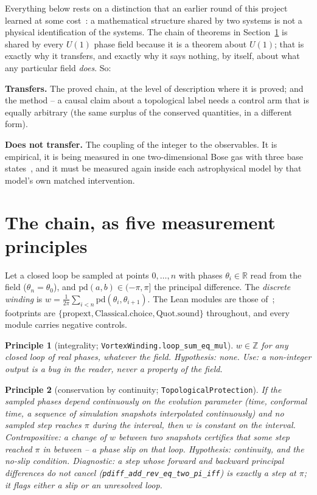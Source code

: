 \documentclass[11pt,a4paper]{article}
\newcommand{\lean}[1]{\texttt{\small #1}}
\newtheorem{principle}{Principle}
\begin{document}
Everything below rests on a distinction that an earlier round of this project learned at some
cost~\cite{Callens2026Wasserstein}: a mathematical structure shared by two systems is not a physical
identification of the systems. The chain of theorems in Section~\ref{sec:chain} is shared by every
$U(1)$ phase field because it is a theorem about $U(1)$; that is exactly why it transfers, and exactly
why it says nothing, by itself, about what any particular field \emph{does}. So:
\begin{keybox}
\textbf{Transfers.} The proved chain, at the level of description where it is proved; and the method
-- a causal claim about a topological label needs a control arm that is equally arbitrary (the same
surplus of the conserved quantities, in a different form).

\textbf{Does not transfer.} The coupling of the integer to the observables. It is empirical, it is
being measured in one two-dimensional Bose gas with three base states~\cite{Callens2026Causal}, and
it must be measured again inside each astrophysical model by that model's own matched
intervention.
\end{keybox}

\section{The chain, as five measurement principles}\label{sec:chain}

Let a closed loop be sampled at points $0,\dots,n$ with phases $\theta_i\in\mathbb R$ read from the
field ($\theta_n=\theta_0$), and $\mathrm{pd}(a,b)\in(-\pi,\pi]$ the principal difference. The
\emph{discrete winding} is $w=\frac1{2\pi}\sum_{i<n}\mathrm{pd}(\theta_i,\theta_{i+1})$. The Lean
modules are those of~\cite{Callens2026Causal,Callens2026Lean}; footprints are
$\{\mathrm{propext},\mathrm{Classical.choice},\mathrm{Quot.sound}\}$ throughout, and every module
carries negative controls.

\begin{principle}[integrality; \lean{VortexWinding.loop\_sum\_eq\_mul}]
$w\in\mathbb Z$ for any closed loop of real phases, whatever the field. \emph{Hypothesis:} none.
\emph{Use:} a non-integer output is a bug in the reader, never a property of the field.
\end{principle}

\begin{principle}[conservation by continuity; \lean{TopologicalProtection}]
If the sampled phases depend continuously on the evolution parameter (time, conformal time, a
sequence of simulation snapshots interpolated continuously) and no sampled step reaches $\pi$ during
the interval, then $w$ is constant on the interval. Contrapositive: a change of $w$ between two
snapshots certifies that some step reached $\pi$ in between -- a phase slip on that loop.
\emph{Hypothesis:} continuity, and the no-slip condition. \emph{Diagnostic:} a step whose forward and
backward principal differences do not cancel (\lean{pdiff\_add\_rev\_eq\_two\_pi\_iff}) is exactly a
step at $\pi$; it flags either a slip or an unresolved loop.
\end{principle}
\end{document}
